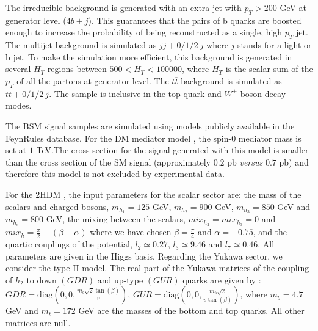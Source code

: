 The irreducible background is generated with an extra jet with $p_T>200$ GeV at generator level ($4b+j$). This guarantees that the pairs of b quarks are boosted enough to increase the probability of being reconstructed as a single, high $p_T$ jet. The multijet background is simulated as $jj+0/1/2~j$ where $j$ stands for a light or b jet. To make the simulation more efficient, this background is generated in several $H_T$ regions between $500<H_T<100000$, where $H_T$ is the scalar sum of the $p_T$ of all the partons at generator level. The $t\overline{t}$ background is simulated as $t\overline{t}+0/1/2~j$. The sample is inclusive in the top quark and $W^{\pm}$ boson decay modes.

The BSM signal samples are simulated using models publicly available in the FeynRules database. For the DM mediator model \cite{DM}, the spin-$0$ mediator mass is set at $1$ TeV.The cross section for the signal
generated with this model is smaller than the cross section of the SM signal (approximately $0.2$ pb \textit{versus} $0.7$ pb) and therefore this model is not excluded by experimental data. 

For the 2HDM \cite{2HDM,2HDM1}, the input parameters for the scalar sector are: the mass of the scalars and charged bosons, $m_{h_1}=125$ GeV, $m_{h_2}=900$ GeV, $m_{h_3}=850$ GeV and $m_{h_c}=800$ GeV, the mixing between the scalars, $mix_{h_2}=mix_{h_3}=0$ and $mix_h=\frac{\pi}{2}-(\beta-\alpha)$ where we have chosen $\beta=\frac{\pi}{4}$ and $\alpha=-0.75$, and the quartic couplings of the potential, $l_2\simeq0.27$, $l_3\simeq9.46$ and $l_7\simeq0.46$. All parameters are given in the Higgs basis. Regarding the Yukawa sector, we consider the type II model. The real part of the Yukawa matrices of the coupling of $h_2$ to down $(GDR)$ and up-type $(GUR)$ quarks are given by \cite{2HDM}: $GDR=\text{diag}\left(0,0,\frac{m_b\sqrt{2}\tan(\beta)}{v}\right)$, $GUR=\text{diag}\left(0,0,\frac{m_b\sqrt{2}}{v\tan(\beta)}\right)$, where $m_b=4.7$ GeV and $m_t=172$ GeV are the masses of the bottom and top quarks. All other matrices are null.  

